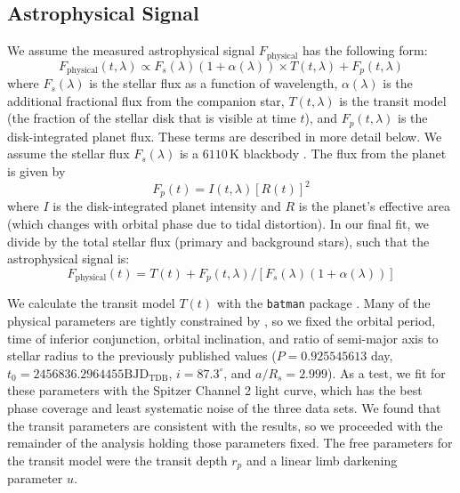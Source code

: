 \documentclass[twocolumn]{aastex61}
\begin{document}
\subsection{Astrophysical Signal}
We assume the measured astrophysical signal $F_\mathrm{physical}$ has the following form:
\begin{equation}
	F_\mathrm{physical}(t, \lambda) \propto F_s(\lambda) (1 + \alpha(\lambda)) \times T(t, \lambda) + F_p(t, \lambda) 
\end{equation}
where $F_s(\lambda)$ is the stellar flux as a function of wavelength, $\alpha(\lambda)$ is the additional fractional flux from the companion star, $T(t, \lambda)$ is the transit model (the fraction of the stellar disk that is visible at time $t$), and $F_p(t, \lambda)$ is the disk-integrated planet flux. These terms are described in more detail below. We assume the stellar flux $F_s(\lambda)$ is a $6110\,\mathrm{K}$ blackbody \citep{gillon14}. The flux from the planet is given by
\begin{equation}
F_p(t) = I(t, \lambda)[R(t)]^2
\end{equation}
where $I$ is the disk-integrated planet intensity and $R$ is the planet's effective area (which changes with orbital phase due to tidal distortion).  In our final fit, we divide by the total stellar flux (primary and background stars), such that the astrophysical signal is:
\begin{equation}
	F_\mathrm{physical}(t) = T(t) + F_p(t, \lambda) /[F_s(\lambda) (1 + \alpha (\lambda))]
\end{equation}

We calculate the transit model $T(t)$ with the \texttt{batman} package \citep{kreidberg15a}. Many of the physical parameters are tightly constrained by \cite{southworth15}, so we fixed the orbital period, time of inferior conjunction, orbital inclination, and ratio of semi-major axis to stellar radius to the previously published values ($P = 0.925545613$ day, $t_0 = 2456836.2964455 \mathrm{BJD_{TDB}}$, $i = 87.3^\circ$, and $a/R_s = 2.999$). As a test, we fit for these parameters with the Spitzer Channel 2 light curve, which has the best phase coverage and least systematic noise of the three data sets. We found that the transit parameters are consistent with the \cite{southworth15} results, so we proceeded with the remainder of the analysis holding those parameters fixed.  The free parameters for the transit model were the transit depth $r_p$ and a linear limb darkening parameter $u$. 
\end{document}
